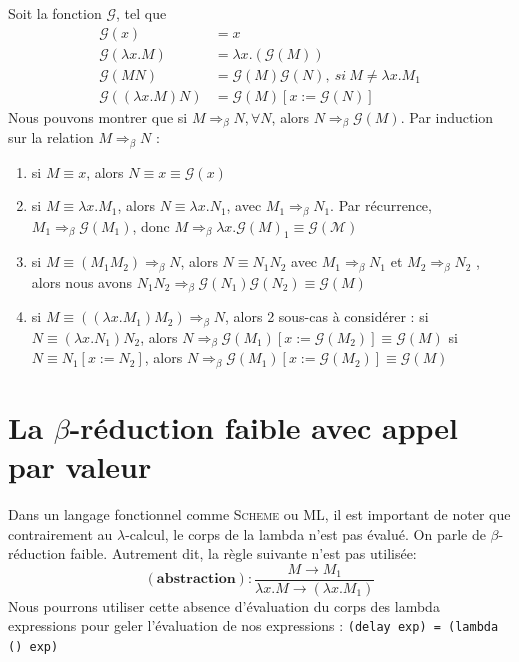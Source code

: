 Soit la fonction $\mathcal{G}$, tel que 
\begin{align}
	\mathcal{G}(x)&=x \\
	\mathcal{G}(\lambda x.M) &= \lambda x.(\mathcal{G}(M)) \\
	\mathcal{G}(MN)&= \mathcal{G}(M)\mathcal{G}(N), \ si\ M \neq \lambda x.M_1 \\
	 \mathcal{G}((\lambda x.M)N) &= \mathcal{G}(M)[x:=\mathcal{G}(N)]  
\end{align}
Nous pouvons montrer que si $M  \Rightarrow _\beta N, \forall N$, alors
$N  \Rightarrow  _\beta \mathcal{G}(M)$.
Par induction sur la relation $M  \Rightarrow _\beta N$  :
 \begin{enumerate}
	\item si $M \equiv x$, alors $N \equiv x \equiv \mathcal{G}(x)$

	\item si $M \equiv \lambda x.M_1$, alors $N \equiv \lambda x.N_1$, avec $M_1  \Rightarrow _\beta N_1$. 
	Par récurrence, $M_1  \Rightarrow _\beta \mathcal{G}(M_1)$, donc $M  \Rightarrow _\beta \lambda x.\mathcal{G}(M)_1 \equiv
	\mathcal{G(M)}$

	\item si $M\equiv (M_1 M_2)  \Rightarrow _\beta  N $, alors $N \equiv N_1 N_2$ 
	avec $M_1 \Rightarrow _\beta N_1$ et  $M_2 \Rightarrow _\beta N_2$ , alors nous avons
	 $N_1 N_2 \Rightarrow _\beta \mathcal{G}(N_1) \mathcal{G}(N_2) \equiv \mathcal{G}(M)$

	 \item si $M\equiv ((\lambda x.M_1)M_2) \Rightarrow _\beta N$, alors 2 sous-cas à considérer :
	 \subitem 
	      si $N \equiv (\lambda x.N_1)N_2$, alors $N \Rightarrow _\beta \mathcal{G}(M_1)[x:=\mathcal{G}(M_2)] \equiv \mathcal{G}(M)$
	 \subitem 
	      si $N \equiv N_1[x:=N_2]$, alors $N \Rightarrow _\beta \mathcal{G}(M_1)[x:=\mathcal{G}(M_2)] \equiv \mathcal{G}(M)$ 


\end{enumerate}


\section{La $\beta$-réduction faible avec appel par valeur}
Dans un langage fonctionnel comme \textsc{Scheme} ou \textsc{ML}, il est important de noter que contrairement au $\lambda$-calcul, le corps de la lambda n'est pas \'{e}valu\'{e}. 
On parle de $\beta$-réduction faible.  
Autrement dit, la règle suivante n'est pas utilisée:
$$\mathbf{(abstraction)} : \frac{M \rightarrow M_1}{ \lambda x.M \rightarrow (\lambda x.M_1)}$$
Nous pourrons utiliser cette absence d'\'{e}valuation du corps 
des lambda expressions pour geler l'\'{e}valuation de nos expressions : \verb+(delay exp) = (lambda () exp)+ 

